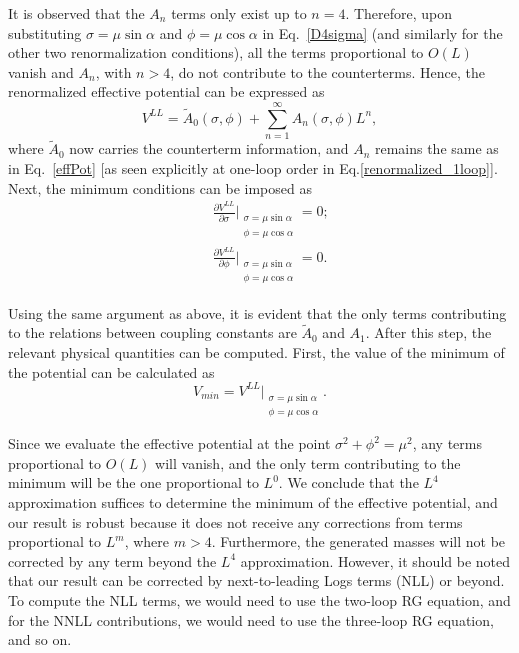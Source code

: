 \documentclass[11pt,a4paper,english,superscriptaddress,preprint,aps,prd]{revtex4}
\begin{document}
It is observed that the $A_n$ terms only exist up to $n=4$. Therefore, upon substituting $\sigma = \mu\sin\alpha$ and $\phi = \mu\cos\alpha$ in Eq.~\eqref{D4sigma} (and similarly for the other two renormalization conditions), all the terms proportional to $O(L)$ vanish and $A_n$, with $n>4$, do not contribute to the counterterms. Hence, the renormalized effective potential can be expressed as
\begin{equation}
 V^{LL} = \tilde{A}_0(\sigma,\phi) + \sum_{n=1}^\infty A_n(\sigma,\phi)L^n,
\end{equation}
where $\tilde{A}_0$ now carries the counterterm information, and $A_n$ remains the same as in Eq.~\eqref{effPot} [as seen explicitly at one-loop order in Eq.\eqref{renormalized_1loop}]. Next, the minimum conditions can be imposed as
\begin{subequations}
 \begin{eqnarray}
  &&\frac{\partial V^{LL}}{\partial\sigma}\Bigr |_{\substack{\sigma=\mu\sin\alpha\\\phi=\mu\cos\alpha}} = 0;\\
  &&\frac{\partial V^{LL}}{\partial\phi}\Bigr |_{\substack{\sigma=\mu\sin\alpha\\\phi=\mu\cos\alpha}} = 0.
 \end{eqnarray}
\end{subequations}

Using the same argument as above, it is evident that the only terms contributing to the relations between coupling constants are $\tilde{A}_{0}$ and $A_1$. After this step, the relevant physical quantities can be computed. First, the value of the minimum of the potential can be calculated as
\begin{equation}
 V_{min} = V^{LL}\Bigr |_{\substack{\sigma=\mu\sin\alpha\\\phi=\mu\cos\alpha}}.
\end{equation}

Since we evaluate the effective potential at the point $\sigma^2+\phi^2 = \mu^2$, any terms proportional to $O(L)$ will vanish, and the only term contributing to the minimum will be the one proportional to $L^0$. We conclude that the $L^4$ approximation suffices to determine the minimum of the effective potential, and our result is robust because it does not receive any corrections from terms proportional to $L^m$, where $m>4$. Furthermore, the generated masses will not be corrected by any term beyond the $L^4$ approximation. However, it should be noted that our result can be corrected by next-to-leading Logs terms (NLL) or beyond. To compute the NLL terms, we would need to use the two-loop RG equation, and for the NNLL contributions, we would need to use the three-loop RG equation, and so on.
\end{document}
